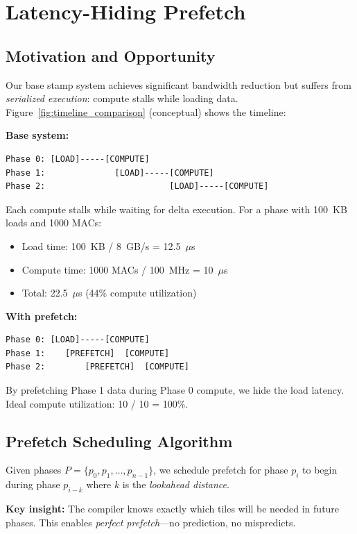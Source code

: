 \documentclass[journal]{IEEEtran}
\begin{document}
\section{Latency-Hiding Prefetch}

\subsection{Motivation and Opportunity}

Our base stamp system achieves significant bandwidth reduction but suffers from \textit{serialized execution}: compute stalls while loading data. Figure~\ref{fig:timeline_comparison} (conceptual) shows the timeline:

\textbf{Base system:}
\begin{verbatim}
Phase 0: [LOAD]-----[COMPUTE]
Phase 1:              [LOAD]-----[COMPUTE]
Phase 2:                         [LOAD]-----[COMPUTE]
\end{verbatim}

Each compute stalls while waiting for delta execution. For a phase with 100~KB loads and 1000 MACs:
\begin{itemize}
\item Load time: 100~KB / 8~GB/s = 12.5~$\mu$s
\item Compute time: 1000 MACs / 100~MHz = 10~$\mu$s
\item Total: 22.5~$\mu$s (44\% compute utilization)
\end{itemize}

\textbf{With prefetch:}
\begin{verbatim}
Phase 0: [LOAD]-----[COMPUTE]
Phase 1:    [PREFETCH]  [COMPUTE]
Phase 2:        [PREFETCH]  [COMPUTE]
\end{verbatim}

By prefetching Phase 1 data during Phase 0 compute, we hide the load latency. Ideal compute utilization: 10 / 10 = 100\%.

\subsection{Prefetch Scheduling Algorithm}

Given phases $P = \{p_0, p_1, \ldots, p_{n-1}\}$, we schedule prefetch for phase $p_i$ to begin during phase $p_{i-k}$ where $k$ is the \textit{lookahead distance}.

\textbf{Key insight:} The compiler knows exactly which tiles will be needed in future phases. This enables \textit{perfect prefetch}—no prediction, no mispredicts.
\end{document}
